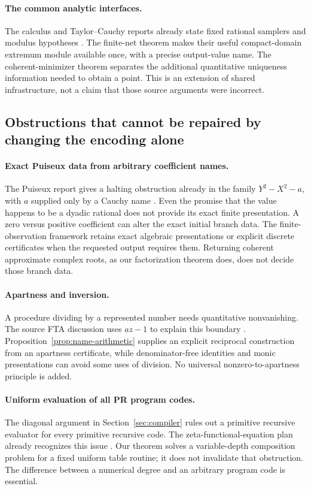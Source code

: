 \paragraph{The common analytic interfaces.}
The calculus and Taylor--Cauchy reports already state fixed rational
samplers and modulus hypotheses \cite{repo-calculus,repo-taylor}.
The finite-net theorem makes their useful compact-domain extremum module
available once, with a precise output-value name. The coherent-minimizer
theorem separates the additional quantitative uniqueness information
needed to obtain a point. This is an extension of shared infrastructure,
not a claim that those source arguments were incorrect.

\subsection{Obstructions that cannot be repaired by changing the encoding alone}

\paragraph{Exact Puiseux data from arbitrary coefficient names.}
The Puiseux report gives a halting obstruction already in the family
$Y^2-X^2-a$, with $a$ supplied only by a Cauchy name
\cite{repo-puiseux}. Even the promise that the value happens to be a
dyadic rational does not provide its exact finite presentation. A zero
versus positive coefficient can alter the exact initial branch data.
The finite-observation framework retains exact algebraic presentations
or explicit discrete certificates when the requested output requires
them. Returning coherent approximate complex roots, as our factorization
theorem does, does not decide those branch data.

\paragraph{Apartness and inversion.}
A procedure dividing by a represented number needs quantitative
nonvanishing. The source FTA discussion uses $az-1$ to explain this
boundary \cite{repo-fta}. Proposition~\ref{prop:name-arithmetic} supplies
an explicit reciprocal construction from an apartness certificate,
while denominator-free identities and monic presentations can avoid some
uses of division. No universal nonzero-to-apartness principle is added.

\paragraph{Uniform evaluation of all PR program codes.}
The diagonal argument in Section~\ref{sec:compiler} rules out a primitive
recursive evaluator for every primitive recursive code. The
zeta-functional-equation plan already recognizes this issue
\cite{repo-zeta-plan}. Our theorem solves a variable-depth composition
problem for a fixed uniform table routine; it does not invalidate that
obstruction. The difference between a numerical degree and an arbitrary
program code is essential.

